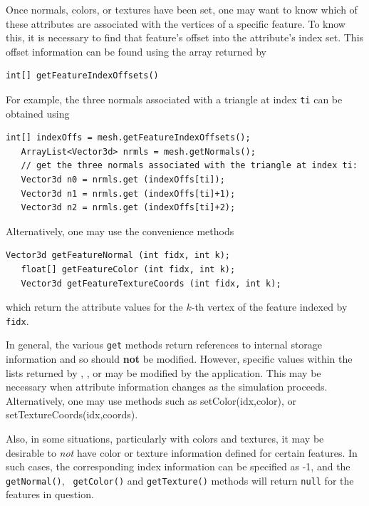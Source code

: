 Once normals, colors, or textures have been set, 
one may want to know which of these attributes are
associated with the vertices of a specific feature. To know this,
it is necessary to find that feature's offset into the 
attribute's index set. This offset information can
be found using the array returned by
%
\begin{lstlisting}[]
  int[] getFeatureIndexOffsets()
\end{lstlisting}
%
For example, the three normals associated with a triangle at index
{\tt ti} can be obtained using
%
\begin{lstlisting}[]
   int[] indexOffs = mesh.getFeatureIndexOffsets();
   ArrayList<Vector3d> nrmls = mesh.getNormals();
   // get the three normals associated with the triangle at index ti:
   Vector3d n0 = nrmls.get (indexOffs[ti]);
   Vector3d n1 = nrmls.get (indexOffs[ti]+1);
   Vector3d n2 = nrmls.get (indexOffs[ti]+2);
\end{lstlisting}
%
Alternatively, one may use the convenience methods
%
\begin{lstlisting}[]
   Vector3d getFeatureNormal (int fidx, int k);
   float[] getFeatureColor (int fidx, int k);
   Vector3d getFeatureTextureCoords (int fidx, int k);
\end{lstlisting}
%
which return the attribute values for the $k$-th vertex of
the feature indexed by {\tt fidx}.

In general, the various {\tt get} methods return references to
internal storage information and so should
{\bf not} be modified. However, specific values within the lists
returned by 
, 
, or
may be modified by the application.  This may be
necessary when attribute information changes as the simulation
proceeds. Alternatively, one may use methods such
as 
%
{setColor(idx,color)}, or
%
{setTextureCoords(idx,coords)}.

Also, in some situations, particularly with colors and textures, it
may be desirable to {\it not} have color or texture information
defined for certain features. In such cases, the corresponding index
information can be specified as -1, and the {\tt getNormal()}, {\tt
getColor()} and {\tt getTexture()} methods will return {\tt null} for
the features in question.

